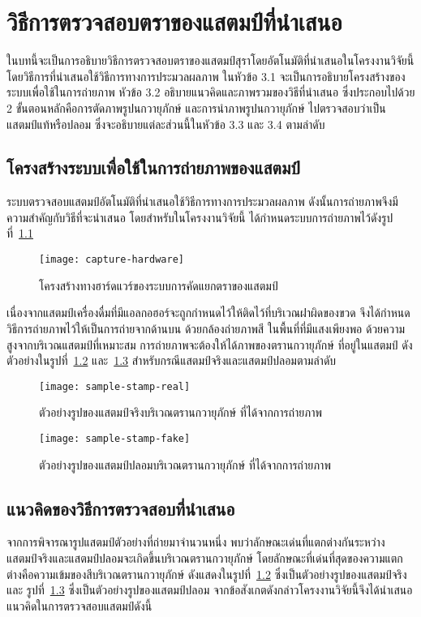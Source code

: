 \chapter{วิธีการตรวจสอบตราของแสตมป์ที่นำเสนอ}
\label{ch:proposed}
ในบทนี้จะเป็นการอธิบายวิธีการตรวจสอบตราของแสตมป์สุราโดยอัตโนมัติที่นำเสนอในโครงงานวิจัยนี้  โดยวิธีการที่นำเสนอใช้วิธีการทางการประมวลผลภาพ  ในหัวข้อ 3.1 จะเป็นการอธิบายโครงสร้างของระบบเพื่อใช้ในการถ่ายภาพ หัวข้อ 3.2 อธิบายแนวคิดและภาพรวมของวิธีที่นำเสนอ ซึ่งประกอบไปด้วย 2 ขั้นตอนหลักคือการตัดภาพรูปนกวายุภักษ์ และการนำภาพรูปนกวายุภักษ์ ไปตรวจสอบว่าเป็นแสตมป์แท้หรือปลอม ซึ่งจะอธิบายแต่ละส่วนนี้ในหัวข้อ 3.3 และ 3.4 ตามลำดับ
\section{โครงสร้างระบบเพื่อใช้ในการถ่ายภาพของแสตมป์}
ระบบตรวจสอบแสตมป์อัตโนมัติที่นำเสนอใช้วิธีการทางการประมวลผลภาพ ดังนั้นการถ่ายภาพจึงมีความสำคัญกับวิธีที่จะนำเสนอ โดยสำหรับในโครงงานวิจัยนี้ ได้กำหนดระบบการถ่ายภาพไว้ดังรูปที่~\ref{fig:hardware}

\begin{figure}[!ht]
\centering
\texttt{[image: capture-hardware]}
\caption{โครงสร้างทางฮาร์ดแวร์ของระบบการคัดแยกตราของแสตมป์}
\label{fig:hardware}
\end{figure}

เนื่องจากแสตมป์เครื่องดื่มที่มีแอลกอฮอร์จะถูกกำหนดไว้ให้ติดไว้ที่บริเวณฝาผิดของขวด จึงได้กำหนดวิธีการถ่ายภาพไว้ให้เป็นการถ่ายจากด้านบน ด้วยกล้องถ่ายภาพสี ในพื้นที่ที่มีแสงเพียงพอ  ด้วยความสูงจากบริเวณแสตมป์ที่เหมาะสม การถ่ายภาพจะต้องให้ได้ภาพของตรานกวายุภักษ์ ที่อยู่ในแสตมป์ ดังตัวอย่างในรูปที่~\ref{fig:stamp-real} และ~\ref{fig:stamp-fake}  สำหรับกรณีแสตมป์จริงและแสตมป์ปลอมตามลำดับ

\begin{figure}[!ht]
\centering
\texttt{[image: sample-stamp-real]}
\vspace{2em}
\caption{ตัวอย่างรูปของแสตมป์จริงบริเวณตรานกวายุภักษ์ ที่ได้จากการถ่ายภาพ}
\label{fig:stamp-real}
\end{figure}

\begin{figure}[!ht]
\centering
\texttt{[image: sample-stamp-fake]}
\vspace{2em}
\caption{ตัวอย่างรูปของแสตมป์ปลอมบริเวณตรานกวายุภักษ์ ที่ได้จากการถ่ายภาพ}
\label{fig:stamp-fake}
\end{figure}

\section{แนวคิดของวิธีการตรวจสอบที่นำเสนอ}
จากการพิจารณารูปแสตมป์ตัวอย่างที่ถ่ายมาจำนวนหนึ่ง พบว่าลักษณะเด่นที่แตกต่างกันระหว่างแสตมป์จริงและแสตมป์ปลอมจะเกิดขึ้นบริเวณตรานกวายุภักษ์ โดยลักษณะที่เด่นที่สุดของความแตกต่างคือความเข้มของสีบริเวณตรานกวายุภักษ์  ดังแสดงในรูปที่~\ref{fig:stamp-real}  ซึ่งเป็นตัวอย่างรูปของแสตมป์จริง และ รูปที่~\ref{fig:stamp-fake}  ซึ่งเป็นตัวอย่างรูปของแสตมป์ปลอม จากข้อสังเกตดังกล่าวโครงงานวิจัยนี้จึงได้นำเสนอแนวคิดในการตรวจสอบแสตมป์ดังนี้

